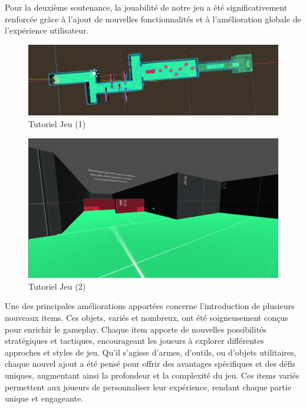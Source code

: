 \documentclass[
	article,			%
	11pt,				%
	oneside,			%
	a4paper,			%
	chapter=TITLE,
	french,			%
	sumario=tradicional
	]{base_nt}
\begin{document}
\newpage

Pour la deuxième soutenance, la jouabilité de notre jeu a été significativement renforcée grâce à l'ajout de nouvelles fonctionnalités et à l'amélioration globale de l'expérience utilisateur.

\begin{figure}[ht]
	\caption{Tutoriel Jeu (1)}
	\centering
	\includegraphics[width=1\linewidth]{paper23.png}
	\legend{}
	
\end{figure}

\begin{figure}[ht]
	\caption{Tutoriel Jeu (2)}
	\centering
	\includegraphics[width=1\linewidth]{paper24.png}
	\legend{}
	
\end{figure}

\newpage

Une des principales améliorations apportées concerne l'introduction de plusieurs nouveaux items. Ces objets, variés et nombreux, ont été soigneusement conçus pour enrichir le gameplay. Chaque item apporte de nouvelles possibilités stratégiques et tactiques, encourageant les joueurs à explorer différentes approches et styles de jeu. Qu'il s'agisse d'armes, d'outils, ou d'objets utilitaires, chaque nouvel ajout a été pensé pour offrir des avantages spécifiques et des défis uniques, augmentant ainsi la profondeur et la complexité du jeu. Ces items variés permettent aux joueurs de personnaliser leur expérience, rendant chaque partie unique et engageante.
\end{document}

